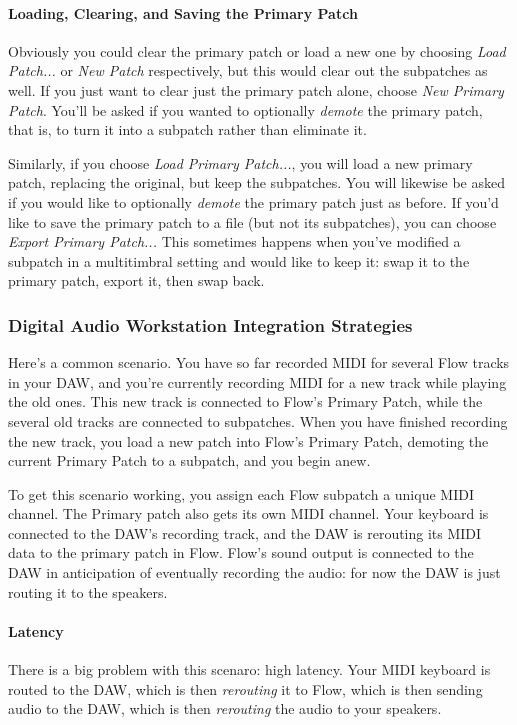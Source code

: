 \documentclass{article}
\begin{document}
\paragraph{Loading, Clearing, and Saving the Primary Patch}  Obviously you could clear the primary patch or load a new one by choosing {\it Load Patch...} or {\it New Patch} respectively, but this would clear out the subpatches as well.  If you just want to clear just the primary patch alone, choose {\it New Primary Patch}.  You'll be asked if you wanted to optionally {\it demote} the primary patch, that is, to turn it into a subpatch rather than eliminate it. 

Similarly, if you choose {\it Load Primary Patch...}, you will load a new primary patch, replacing the original, but keep the subpatches.  You will likewise be asked if you would like to optionally {\it demote} the primary patch just as before.  If you'd like to save the primary patch to a file (but not its subpatches), you can choose {\it Export Primary Patch...}  This sometimes happens when you've modified a subpatch in a multitimbral setting and would like to keep it: swap it to the primary patch, export it, then swap back.

\subsubsection{Digital Audio Workstation Integration Strategies}

Here's a common scenario.  You have so far recorded MIDI for several Flow tracks in your DAW, and you're currently recording MIDI for a new track while playing the old ones.  This new track is connected to Flow's Primary Patch, while the several old tracks are connected to subpatches.  When you have finished recording the new track, you load a new patch into Flow's Primary Patch, demoting the current Primary Patch to a subpatch, and you begin anew.

To get this scenario working, you assign each Flow subpatch a unique MIDI channel.  The Primary patch also gets its own MIDI channel.  Your keyboard is connected to the DAW's recording track, and the DAW is rerouting its MIDI data to the primary patch in Flow.  Flow's sound output is connected to the DAW in anticipation of eventually recording the audio: for now the DAW is just routing it to the speakers.

\paragraph{Latency} There is a big problem with this scenaro: high latency.  Your MIDI keyboard is routed to the DAW, which is then {\it rerouting} it to Flow, which is then sending audio to the DAW, which is then {\it rerouting} the audio to your speakers.
\end{document}
